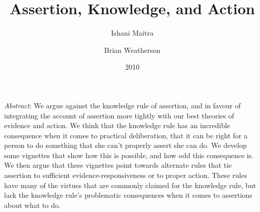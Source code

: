 \documentclass[
  11pt,
  letterpaper,
  DIV=11,
  numbers=noendperiod,
  twoside]{scrartcl}
\title{Assertion, Knowledge, and Action}
\author{Ishani Maitra \and Brian Weatherson}
\date{2010}
\renewenvironment{abstract}
 {\vspace{-1.25cm}
 \quotation\small\noindent\emph{Abstract}:}
 {\endquotation}
\renewenvironment{abstract}
 {\quotation\small\noindent\emph{Abstract}:}
 {\endquotation\vspace{-0.02cm}}
\begin{document}
\maketitle
\begin{abstract}
We argue against the knowledge rule of assertion, and in favour of
integrating the account of assertion more tightly with our best theories
of evidence and action. We think that the knowledge rule has an
incredible consequence when it comes to practical deliberation, that it
can be right for a person to do something that she can't properly assert
she can do. We develop some vignettes that show how this is possible,
and how odd this consequence is. We then argue that these vignettes
point towards alternate rules that tie assertion to sufficient
evidence-responsiveness or to proper action. These rules have many of
the virtues that are commonly claimed for the knowledge rule, but lack
the knowledge rule's problematic consequences when it comes to
assertions about what to do.
\end{abstract}
\end{document}
